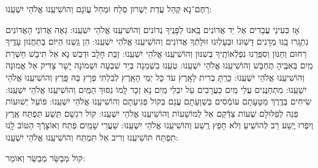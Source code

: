 \documentclass[twoside, openany, parskip=half, 11pt]{book}
\begin{document}
\shatzvkahal
 רַחֶם־נָא קְהַל עֲדַת יְשֻׁרוּן סְלַח וּמְחַל עֲוֹנָם וְהוֹשִׁיעֵֽנוּ אֱלֹהֵי יִשְׁעֵֽנוּ:

\begin{small}
אָז כְּעֵינֵי עֲבָדִים אֶל יַד אֲדוֹנִים 		בָּֽאנוּ לְפָנֶֽיךָ נְדוֹנִים 		וְהוֹשִׁיעֵֽנוּ אֱלֹהֵי יִשְׁעֵֽנוּ: 
גֵּאֶה אֲדוֹנֵי הָאֲדוֹנִים נִתְגָּֽרוּ בָֽנוּ מְדָנִים 	דָּשֽׁוּנוּ וּבְעָלֽוּנוּ זוּלָתְֿךָ אֲדוֹנִים 	וְהוֹשִׁיעֵֽנוּ אֱלֹהֵי יִשְׁעֵֽנוּ:	
הֵן גַּֽשְׁנוּ הַיּוֹם בְּתַחֲנוּן עָדֶֽיךָ רַחוּם וְחַנּוּן 	וְסִפַּֽרְנוּ נִפְלְֿאוֹתֶֽיךָ בְּשִׁנּוּן 	וְהוֹשִׁיעֵֽנוּ אֱלֹהֵי יִשְׁעֵֽנוּ:
 	זָבַת חָלָב וּדְבַשׁ נָא אַל תִּיבָשׁ 		חַשְׁרַת מַֽיִם בְּאִבֶּֽיהָ תֶּחְבָּשׁ 	וְהוֹשִׁיעֵֽנוּ אֱלֹהֵי יִשְׁעֵֽנוּ: 
טְעֵֽנוּ בִשְׁמֵנָה בְּיַד שִׁבְעָה וּשְׁמוֹנָה 		יָשָׁר צַדִּיק אֵל אֱמוּנָה 		וְהוֹשִׁיעֵֽנוּ אֱלֹהֵי יִשְׁעֵֽנוּ: 
כָּרַֽתָּ בְרִית לָאָֽרֶץ עֹד כָּל יְמֵי הָאָֽרֶץ 	לְבִלְתִּי פְרָץ בָּהּ פָּֽרֶץ 		וְהוֹשִׁיעֵֽנוּ אֱלֹהֵי יִשְׁעֵֽנוּ: 
מִתְחַנֲּנִים עֲלֵי מַֽיִם כַּעֲרָבִים עַל יִבְלֵי מַֽיִם 	נָא זְכָר לָֽמוֹ נִסּוּךְ הַמַּֽיִם 	וְהוֹשִׁיעֵֽנוּ אֱלֹהֵי יִשְׁעֵֽנוּ: 
שִׂיחִים בְּדֶֽרֶךְ מַטָּעָתָם עוֹמְֿסִים בְּשַׁוְעָתָם 	עֲנֵם בְּקוֹל פְּגִיעָתָם 		וְהוֹשִׁיעֵֽנוּ אֱלֹהֵי יִשְׁעֵֽנוּ: 
פּוֹעֵל יְשׁוּעוֹת פְּנֵה לְפִלּוּלָם שְׁעוֹת 		צַדְּֿקֵם אֵל לְמוֹשָׁעוֹת 		וְהוֹשִׁיעֵֽנוּ אֱלֹהֵי יִשְׁעֵֽנוּ: 
קוֹל רִגְשָׁם תִּֽשַׁע תִּפְתַּח אֶֽרֶץ וְיִפְרוּ יֶֽשַׁע 	רַב לְהוֹשִֽׁיעַ וְלֹא חָפֵץ רֶֽשַׁע 	וְהוֹשִׁיעֵֽנוּ אֱלֹהֵי יִשְׁעֵֽנוּ:
שַׁעֲרֵי שָׁמַֽיִם פְּתַח וְאוֹצָרְֿךָ הַטּוֹב לָֽנוּ תִפְתַּח 	תּוֹשִׁיעֵֽנוּ וְרִיב אַל תִּמְתַּח 	וְהוֹשִׁיעֵֽנוּ אֱלֹהֵי יִשְׁעֵֽנוּ:

\end{small}

\begin{large}
 קוֹל מְבַשֵּׂר מְבַשֵּׂר וְאוֹמֵר:
 
\end{large}
\end{document}
